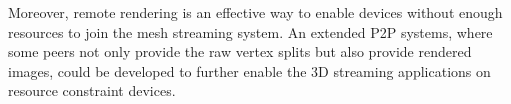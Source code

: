 Moreover, remote rendering is an effective way to enable devices without enough resources to 
join the mesh streaming system. An extended P2P systems, where some peers not only provide the raw vertex splits
but also provide rendered images, could be developed to further enable the 3D streaming applications on resource
constraint devices.
